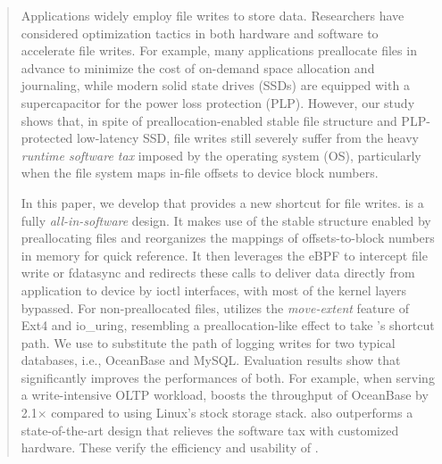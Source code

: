 \begin{abstract}


   Applications widely employ file writes to store data.	
    Researchers 
   have considered optimization tactics in both hardware and software to accelerate file writes.
   For example, many applications preallocate files in advance to minimize the cost of on-demand space allocation and journaling,
   while modern solid state drives (SSDs) are equipped with a supercapacitor for the power loss protection (PLP).
   However, our study shows that, in spite of preallocation-enabled stable file structure and PLP-protected low-latency SSD,
   file writes still severely suffer from the heavy {\em runtime software tax} imposed
   by the operating system (OS), particularly when the file system maps   in-file offsets to
      device block numbers.
      
   In this paper, we develop \odes that provides a new shortcut  for file writes.
   \odes is a fully {\em all-in-software} design.
   It makes use of the stable structure enabled by preallocating files and 
   reorganizes the mappings of offsets-to-block numbers in memory 
   for quick reference. It then leverages 
   the eBPF to intercept file write or fdatasync and redirects these calls 
   to deliver data directly
   from application to device by ioctl interfaces, 
   with most of the kernel layers bypassed. For non-preallocated files, \odes utilizes the {\em move-extent} feature of Ext4
   and io\_uring, resembling a preallocation-like effect to take \odes's shortcut path.
   We use \odes to substitute the path of logging writes for two typical databases, i.e., OceanBase and MySQL.
   Evaluation results show that \odes significantly improves the performances of both.
   For example, when serving a write-intensive OLTP workload,
   \odes boosts the throughput of OceanBase by 2.1$\times$ compared to using Linux's stock storage stack.
   \odes also outperforms a state-of-the-art design that  relieves the software tax with customized hardware.
   These verify the efficiency and usability of \odes.
   
\end{abstract}
      
